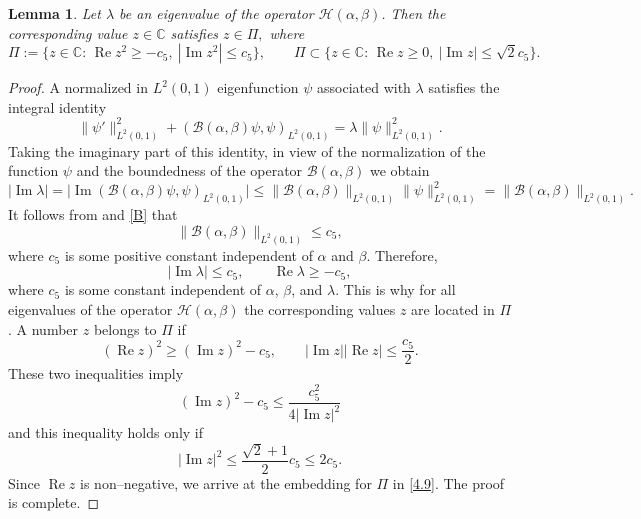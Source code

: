 \documentclass[10pt, a4paper]{article}
\theoremstyle{plain}
\newtheorem{lemma}{Lemma}
\theoremstyle{definition}
\numberwithin{equation}{section}
\def\l{\lambda}
\DeclareMathOperator{\RE}{Re}
\DeclareMathOperator{\IM}{Im}
\begin{document}
\begin{lemma}\label{lm4.1}
Let $\l$  be an eigenvalue of the operator $\mathcal{H}(\alpha, \beta)$. Then the corresponding value $z\in\mathds{C}$
satisfies $z\in\Pi,$ where
\begin{equation}\label{4.9}
\Pi:=\{z\in\mathds{C}:\,\RE z^2\geqslant -c_{5},\ |\IM z^2|\leqslant c_{5}\},\qquad \Pi\subset
 \Big\{z\in\mathds{C}:\,\RE z\geqslant 0,\ |\IM z|\leqslant \sqrt{2}c_{5}\Big\}.
\end{equation}
\end{lemma}

\begin{proof}
A normalized in $L^2(0, 1)$ eigenfunction $\psi$ associated with $\lambda$ satisfies the integral identity
\[
\|\psi'\|_{L^2(0, 1)}^2+(\mathcal{B}(\alpha, \beta)\psi, \psi)_{L^2(0, 1)}=\lambda\|\psi\|_{L^2(0, 1)}^2.
\]
Taking the imaginary part of this identity, in view of the normalization of the function $\psi$ and the boundedness
of the operator $\mathcal{B}(\alpha, \beta)$ we obtain
\[
|\IM \lambda|=\Big|\IM (\mathcal{B}(\alpha, \beta)\psi, \psi)_{L^2(0, 1)}\Big|\leqslant
\|\mathcal{B}(\alpha, \beta)\|_{L^2(0, 1)}\|\psi\|_{L^2(0, 1)}^2= \|\mathcal{B}(\alpha, \beta)\|_{L^2(0, 1)}.
\]
It follows from \cite[Lemma~1]{Borisov_Polyakov} and \eqref{B} that
\begin{equation*}%
\|\mathcal{B}(\alpha, \beta)\|_{L^2(0, 1)}\leqslant c_{5},
\end{equation*}
where $c_{5}$ is some positive constant independent of $\alpha$ and $\beta$. Therefore,
\begin{equation*}%
|\IM \lambda|\leqslant c_{5}, \qquad  \RE \lambda\geqslant -c_{5},
\end{equation*}
where $c_{5}$ is some constant independent of $\alpha$, $\beta$, and $\lambda$. This is why for all eigenvalues of the
operator $\mathcal{H}(\alpha, \beta)$ the corresponding values $z$ are located in $\Pi$.
A number $z$ belongs to $\Pi$ if
\begin{equation*}
(\RE z)^2\geqslant (\IM z)^2-c_{5},\qquad |\IM z||\RE z|\leqslant \frac{c_{5}}{2}.
\end{equation*}
These two inequalities imply
\begin{equation*}
(\IM z)^2-c_{5}\leqslant \frac{c_{5}^2}{4|\IM z|^2}
\end{equation*}
and this inequality holds only if
\begin{equation*}
|\IM z|^2 \leqslant \frac{\sqrt{2}+1}{2}c_{5}\leqslant 2c_{5}.
\end{equation*}
Since $\RE z$ is non--negative, we arrive at the embedding for $\Pi$ in \eqref{4.9}. The proof is complete.
 \end{proof}
\end{document}
